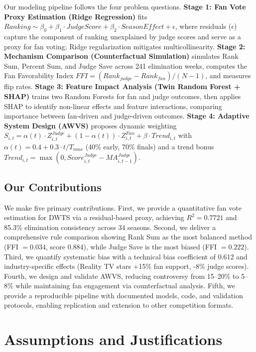 \documentclass{mcmthesis}
\begin{document}
Our modeling pipeline follows the four problem questions. \textbf{Stage 1: Fan Vote Proxy Estimation (Ridge Regression)} fits $Ranking \sim \beta_0 + \beta_1 \cdot JudgeScore + \beta_2 \cdot SeasonEffect + \epsilon$, where residuals ($\epsilon$) capture the component of ranking unexplained by judge scores and serve as a proxy for fan voting; Ridge regularization mitigates multicollinearity. \textbf{Stage 2: Mechanism Comparison (Counterfactual Simulation)} simulates Rank Sum, Percent Sum, and Judge Save across 241 elimination weeks, computes the Fan Favorability Index $FFI = (Rank_{judge} - Rank_{fan})/(N-1)$, and measures flip rates. \textbf{Stage 3: Feature Impact Analysis (Twin Random Forest + SHAP)} trains two Random Forests for fan and judge outcomes, then applies SHAP to identify non-linear effects and feature interactions, comparing importance between fan-driven and judge-driven outcomes. \textbf{Stage 4: Adaptive System Design (AWVS)} proposes dynamic weighting $S_{i,t} = \alpha(t) \cdot Z^{Judge}_{i,t} + (1-\alpha(t)) \cdot Z^{Fan}_{i,t} + \beta \cdot Trend_{i,t}$ with $\alpha(t)=0.4+0.3 \cdot t/T_{max}$ (40\% early, 70\% finals) and a trend bonus $Trend_{i,t}=\max(0, Score^{Judge}_{i,t}-MA^{Judge}_{i,t-1})$.


\subsection{Our Contributions}

We make five primary contributions. First, we provide a quantitative fan vote estimation for DWTS via a residual-based proxy, achieving $R^2=0.7721$ and 85.3\% elimination consistency across 34 seasons. Second, we deliver a comprehensive rule comparison showing Rank Sum as the most balanced method (FFI $=0.034$, score 0.884), while Judge Save is the most biased (FFI $=0.222$). Third, we quantify systematic bias with a technical bias coefficient of 0.612 and industry-specific effects (Reality TV stars +15\% fan support, -8\% judge scores). Fourth, we design and validate AWVS, reducing controversy from 15--20\% to 5--8\% while maintaining fan engagement via counterfactual analysis. Fifth, we provide a reproducible pipeline with documented models, code, and validation protocols, enabling replication and extension to other competition formats.

\section{Assumptions and Justifications}
\end{document}
